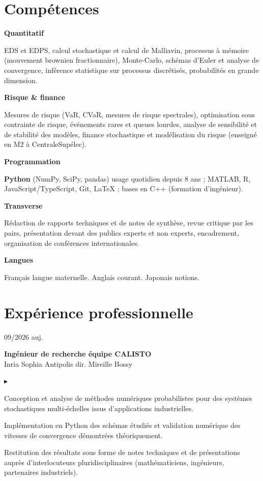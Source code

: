 \documentclass[10pt,a4paper]{article}
\newlength{\datecol}\setlength{\datecol}{0.165\textwidth}
\newlength{\gutter}\setlength{\gutter}{1em}
\newlength{\bodycol}
\newcommand{\entry}[3]{%
  \par\vspace{1.0ex plus 0.9ex minus 0.1ex}\noindent
  \begin{minipage}[t]{\datecol}
    \vspace{0pt}\raggedright\small\color{muted}#1
  \end{minipage}%
  \hspace{\gutter}%
  \begin{minipage}[t]{\bodycol}
    \vspace{0pt}\raggedright
    {\headingfont\bfseries\small #2}\\[0.15ex]
    {\small\color{accent}#3}
  \end{minipage}%
  \par\vspace{0.3ex}
}
\newenvironment{bullets}
  {\begin{list}{\textcolor{accent}{\scriptsize$\blacktriangleright$}}{%
      \setlength{\leftmargin}{\datecol}
      \addtolength{\leftmargin}{\gutter}
      \addtolength{\leftmargin}{1.25em}
      \setlength{\rightmargin}{0pt}
      \setlength{\labelwidth}{0.9em}
      \setlength{\labelsep}{0.35em}
      \setlength{\itemsep}{0.2ex}
      \setlength{\parsep}{0pt}
      \setlength{\topsep}{0.4ex}
      \setlength{\partopsep}{0pt}
      \small}}
  {\end{list}}
\newcommand{\skillrow}[2]{%
  \par\noindent
  \begin{minipage}[t]{\datecol}
    \vspace{0pt}\raggedright{\headingfont\bfseries\footnotesize #1}
  \end{minipage}%
  \hspace{\gutter}%
  \begin{minipage}[t]{\bodycol}
    \vspace{0pt}\raggedright\small #2
  \end{minipage}%
  \par\vspace{0.7ex}
}
\newcommand{\cpp}{\mbox{C++}}
\begin{document}
\section{Compétences}
\skillrow{Quantitatif}{EDS et EDPS, calcul stochastique et calcul de Malliavin, processus à mémoire
(mouvement brownien fractionnaire), Monte-Carlo, schémas d'Euler et analyse de convergence, inférence
statistique sur processus discrétisés, probabilités en grande dimension.}
\skillrow{Risque \& finance}{Mesures de risque (VaR, CVaR, mesures de risque spectrales), optimisation
sous contrainte de risque, événements rares et queues lourdes, analyse de sensibilité et de stabilité des
modèles, finance stochastique et modélisation du risque (enseigné en M2 à CentraleSupélec).}
\skillrow{Programmation}{\textbf{Python} (NumPy, SciPy, pandas) \textemdash{} usage quotidien depuis 8 ans ;
MATLAB, R, JavaScript/TypeScript, Git, \LaTeX{} ; bases en \cpp{} (formation d'ingénieur).}
\skillrow{Transverse}{Rédaction de rapports techniques et de notes de synthèse, revue critique par les pairs,
présentation devant des publics experts et non experts, encadrement, organisation de conférences
internationales.}
\skillrow{Langues}{Français \textemdash{} langue maternelle. Anglais \textemdash{} courant. Japonais \textemdash{} notions.}

\section{Expérience professionnelle}

\entry{09/2026 \textemdash{} auj.}{Ingénieur de recherche \textemdash{} équipe CALISTO}{Inria Sophia Antipolis \textemdash{} dir. Mireille Bossy}
\begin{bullets}
  \item Conception et analyse de méthodes numériques probabilistes pour des systèmes stochastiques
  multi-échelles issus d'applications industrielles.
  \item Implémentation en Python des schémas étudiés et validation numérique des vitesses de convergence
  démontrées théoriquement.
  \item Restitution des résultats sous forme de notes techniques et de présentations auprès d'interlocuteurs
  pluridisciplinaires (mathématiciens, ingénieurs, partenaires industriels).
\end{bullets}
\end{document}
